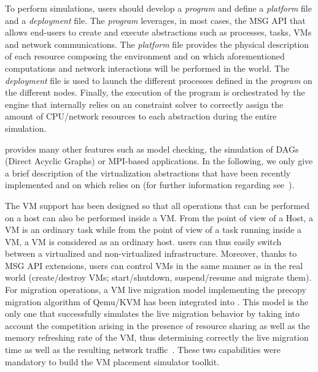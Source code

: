 To perform simulations, users should develop a \emph{program} and
define a \emph{platform} file and a \emph{deployment} file. The
\emph{program} leverages, in most cases, the \sg MSG API that allows
end-users to create and execute \sg abstractions such as processes,
tasks, VMs and network communications. The \emph{platform} file
provides the physical description of each resource composing the
environment and on which aforementioned computations and network
interactions will be performed in the \sg world.
The \emph{deployment} file is used to launch the different \sg
processes defined in the \emph{program} on the different nodes.
Finally, the execution of the program is orchestrated by the \sg
engine that internally relies on an constraint solver to correctly
assign the amount of CPU/network resources to each \sg abstraction
during the entire simulation.

\sg provides many other features such as model checking, the
simulation of DAGs (Direct Acyclic Graphs) or MPI-based
applications. In the following, we only give a brief description of
the virtualization abstractions that have been recently implemented
and on which \vmps relies on (for further information regarding
\sg see~\cite{casanova:hal-01017319}).

The VM support has been designed so that all operations that can be
performed on a host can also be performed inside a VM. From the point
of view of a \sg Host, a \sg VM is an ordinary task while from the
point of view of a task running inside a \sg VM, a VM is considered as
an ordinary host.
\sg users can thus easily switch between a virtualized and
non-virtualized infrastructure.  Moreover, thanks to MSG API
extensions, users can control VMs in the same manner as in the real
world (\eg create/destroy VMs; start/shutdown, suspend/resume and
migrate them).
For migration operations, a VM live migration model implementing the
precopy migration algorithm of Qemu/KVM has been integrated into \sg.
This model is the only one that successfully simulates the live
migration behavior by taking into account the competition arising in
the presence of resource sharing as well as the memory refreshing rate
of the VM, thus determining correctly the live migration time as well
as the resulting network
traffic~\cite{Hirofuchi:2013:ALM:2568486.2568524}.
%
%
These two capabilities were mandatory to build the VM placement
simulator toolkit.

